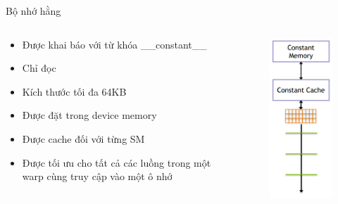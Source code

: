 \documentclass[10pt]{beamer}
\theoremstyle{remark}
\numberwithin{algocf}{section}
\numberwithin{equation}{section}
\numberwithin{dl}{section}
\numberwithin{figure}{section}
\begin{document}
\begin{frame}{Bộ nhớ hằng}
    \begin{columns}[onlytextwidth]
        \begin{column}{0.5\linewidth}
            \begin{itemize}
                \item Được khai báo với từ khóa \_\_constant\_\_
                \item Chỉ đọc 
                \item Kích thước tối đa 64KB
                \item Được đặt trong device memory
                \item Được cache đối với từng SM
                \item Được tối ưu cho tất cả các luồng trong một warp cùng truy cập vào một ô nhớ
            \end{itemize}
        \end{column}
        \begin{column}{0.5\linewidth}
            \begin{figure}[H]
                \centering
                \includegraphics[height=0.9\textheight]{figures/CUDA/GPU_Constant_Memory.png} 
            \end{figure}
        \end{column}
    \end{columns}
\end{frame}
\end{document}
